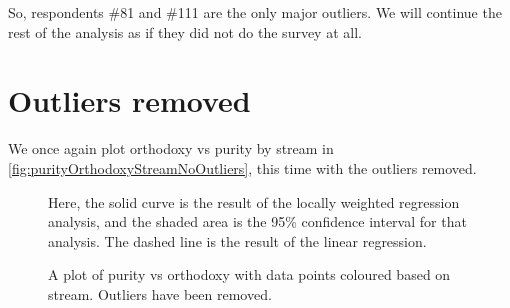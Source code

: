 So, respondents \#81 and \#111 are the only major outliers.
We will continue the rest of the analysis as if they did not do the survey at all.

\section{Outliers removed}
We once again plot orthodoxy vs purity by stream in \vref{fig:purityOrthodoxyStreamNoOutliers}, this time with the outliers removed.
\begin{figure}[H]
	\caption{A plot of purity vs orthodoxy with data points coloured based on stream. Outliers have been removed.}
	\label{fig:purityOrthodoxyStreamNoOutliers}
	Here, the solid curve is the result of the locally weighted regression analysis, and the shaded area is the 95\% confidence interval for that analysis.
	The dashed line is the result of the linear regression.
\end{figure}
